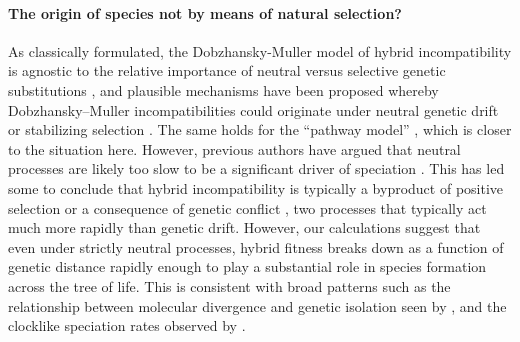 \documentclass{article}
\newcommand{\1}{\mathbbm{1}}
\begin{document}
\paragraph{The origin of species not by means of natural selection?}
As classically formulated, 
the Dobzhansky-Muller model of hybrid incompatibility is agnostic to the relative importance of neutral versus selective genetic substitutions \citep{coyne1998evolutionary},
and plausible mechanisms have been proposed
whereby Dobzhansky--Muller incompatibilities could originate
under neutral genetic drift \citep{lynch2000origin}
or stabilizing selection \citep{fierst}.
The same holds for the ``pathway model'' \citep{lindtke2015genetic},
which is closer to the situation here.
However, previous authors have argued that neutral processes are likely too slow to be a significant driver of speciation \citep{nei1983models,seehausen2014genomics}.
This has led some to conclude that hybrid incompatibility is typically a byproduct of positive selection \citep{orr2004speciation, schluter2009evidence} 
or a consequence of genetic conflict \citep{presgraves2010molecular, crespi2013conflictual},
two processes that typically act much more rapidly than genetic drift.
However, our calculations suggest that even under strictly neutral processes,
hybrid fitness breaks down as a function of genetic distance
rapidly enough to play a substantial role in species formation across the tree of life. 
This is consistent with broad patterns
such as the relationship between molecular divergence and genetic isolation 
seen by \citet{roux2016shedding}, 
and the clocklike speciation rates observed by \citet{hedges2015tree}.
\end{document}
